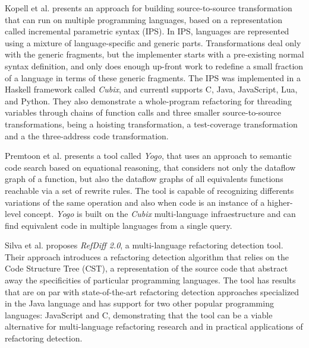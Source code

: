 \documentclass[10pt,sigplan,screen,review,anonymous]{acmart}
\begin{document}
Kopell et al.\cite{kopell2018-language-parametric-transformation} presents an
approach for building source-to-source transformation that can run on multiple
programming languages, based on a representation called incremental parametric
syntax (IPS).
In IPS, languages are represented using a mixture of language-specific and 
generic parts. Transformations deal only with the generic fragments, but 
the implementer starts with a pre-existing normal syntax definition, and 
only does enough up-front work to redefine a small fraction of a language 
in terms of these generic fragments.
The IPS was implemented in a Haskell framework called \textit{Cubix}, 
and currentl supports C, Java, JavaScript, Lua, and Python.
They also demonstrate a whole-program refactoring for threading variables
through chains of function calls and three smaller source-to-source 
transformations, being a hoisting transformation, a test-coverage 
transformation and a the three-address code transformation.

Premtoon et al.\cite{premtoon2020-code-search-equational-reasoning} presents 
a tool called \textit{Yogo}, that uses an approach to semantic code search 
based on equational reasoning, that considers not only the dataflow graph of 
a function, but also the dataflow graphs of all equivalents functions reachable 
via a set of rewrite rules. The tool is capable of recognizing differents 
variations of the same operation and also when code is an instance of a 
higher-level concept.
\textit{Yogo} is built on the \textit{Cubix} multi-language infraestructure and can find
equivalent code in multiple languages from a single query.

Silva et al.\cite{silva2021-refdiff} proposes \textit{RefDiff 2.0}, a 
multi-language refactoring detection tool. Their approach introduces a 
refactoring detection algorithm that relies on the Code Structure Tree 
(CST), a representation of the source code that abstract away the 
specificities of particular programming languages. 
The tool has results that are on par with state-of-the-art refactoring 
detection approaches specialized in the Java language and has support 
for two other popular programming languages: JavaScript and C,
demonstrating that the tool can be a viable alternative for multi-language
refactoring research and in practical applications of refactoring detection.
\end{document}
